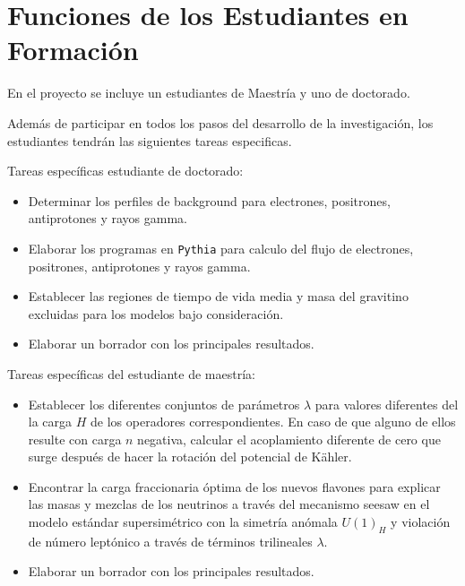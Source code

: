 \section{ Funciones de los Estudiantes en Formación }



En el proyecto se incluye un estudiantes de Maestría y uno de doctorado.

Además de participar en todos los pasos del desarrollo de la
investigación, los estudiantes  tendrán las siguientes
tareas especificas.

Tareas específicas estudiante de doctorado:
\begin{itemize}
\item Determinar los perfiles de background para electrones, positrones, antiprotones y rayos gamma.
\item Elaborar los programas en \texttt{Pythia} para calculo del flujo de electrones, positrones, antiprotones y rayos gamma.
\item Establecer las regiones de tiempo de vida media y masa del gravitino excluidas para los modelos bajo consideración.
\item Elaborar un borrador con los principales resultados.
\end{itemize}

Tareas específicas del estudiante de maestría:
\begin{itemize}
\item Establecer los diferentes conjuntos de parámetros $\lambda$ para valores diferentes del la carga $H$ de los operadores correspondientes. En caso de que alguno de ellos resulte con carga $n$ negativa, calcular el acoplamiento diferente de cero que surge después de hacer la rotación del potencial de K\"ahler.
\item Encontrar la carga fraccionaria óptima de los nuevos flavones para explicar las masas y mezclas de los neutrinos a través del mecanismo seesaw en el modelo estándar supersimétrico con la simetría anómala $U(1)_H$ y violación de número leptónico a través de términos trilineales $\lambda$.
\item Elaborar un borrador con los principales resultados.
\end{itemize}


